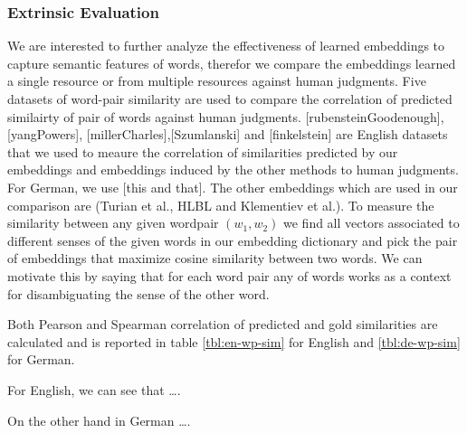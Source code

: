 \subsubsection{Extrinsic Evaluation}
\label{ssec:ent-link-extrinsic}
 \label{exp:word-similarity}
 We are interested to further analyze the effectiveness of learned embeddings to capture semantic features of words, therefor 
 we compare the embeddings learned a single resource or from multiple resources against human judgments.
 Five datasets of word-pair similarity are used to compare the correlation of predicted similairty of 
 pair of words against human judgments.
 [rubensteinGoodenough], [yangPowers], [millerCharles],[Szumlanski] and [finkelstein] are English datasets that we used 
 to meaure the correlation of similarities
 predicted by our embeddings and  embeddings induced by the other methods to human judgments. 
 For German, we use [this and that].
 The other embeddings which are used in our comparison are (Turian et al., HLBL and Klementiev et al.).
 To measure the similarity between any given wordpair $(w_1 , w_2)$ we find all vectors associated to different senses
 of the given words in our embedding dictionary and pick the pair of embeddings that maximize cosine similarity between two words. 
 We can motivate this by saying that for each word pair any of words works as a context for disambiguating the sense of the other word.
  
 Both Pearson and Spearman correlation of predicted and gold similarities 
 are calculated and is reported in table \ref{tbl:en-wp-sim} for English and \ref{tbl:de-wp-sim} for German.
 
 For English, we can see that \ldots.
 
 On the other hand in German \ldots. 
 
